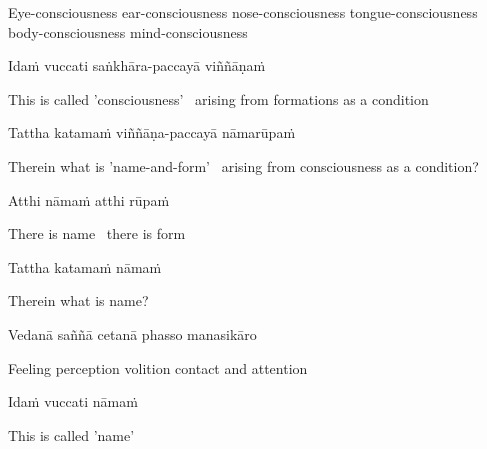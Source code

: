 \begin{english-hang}
  Eye-consciousness ear-consciousness nose-consciousness tongue-consciousness body-consciousness mind-consciousness
\end{english-hang}

Idaṁ vuccati saṅkhāra-paccayā viññāṇaṁ

\begin{english}
  This is called 'consciousness' \breathmark\ arising from formations as a condition
\end{english}

Tattha katamaṁ viññāṇa-paccayā nāmarūpaṁ

\begin{english-hang}
  Therein what is 'name-and-form' \breathmark\ arising from consciousness as a condition?
\end{english-hang}

Atthi nāmaṁ atthi rūpaṁ

\begin{english}
  There is name \breathmark\ there is form
\end{english}

Tattha katamaṁ nāmaṁ

\begin{english}
  Therein what is name?
\end{english}

Vedanā saññā cetanā phasso manasikāro\makeatletter\hyperlink{endnote80-appendix}\makeatother

\begin{english}
  Feeling perception volition contact and attention
\end{english}

Idaṁ vuccati nāmaṁ

\begin{english}
  This is called 'name'
\end{english}

